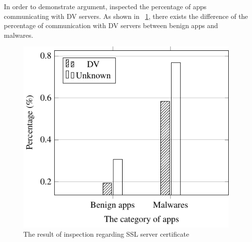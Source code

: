 In order to demonstrate \our argument, \we inspected the percentage of apps communicating with DV servers.
As shown in \figurename~\ref{fig:ssl_inspection}, there exists the difference of the percentage of communication with DV servers between benign apps and malwares.
\begin{figure}[p]
	\centering
	\hspace{-55pt}
	\includegraphics[scale=1.0, bb=9 9 200 200]{./figures/dv_unknown_inspection_tikz.pdf}
	\caption{The result of inspection regarding SSL server certificate} 
	\label{fig:ssl_inspection}
\end{figure}
\afterpage{\clearpage}
\newpage

